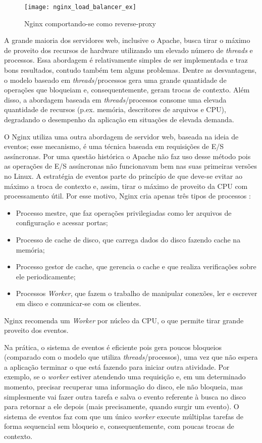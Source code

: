 \begin{figure}[!h]
  \centering
  \texttt{[image: nginx\_load\_balancer\_ex]} 
  \caption[Nginx comportando-se como reverse-proxy]{Nginx comportando-se como reverse-proxy \citep{soni}}
  \label{fig:nginx_basico} 
\end{figure}

A grande maioria dos servidores web, inclusive o Apache, busca tirar o máximo
de proveito dos recursos de hardware utilizando um elevado número de
\emph{threads} e processos. Essa abordagem é relativamente simples de ser
implementada e traz bons resultados, contudo também tem alguns problemas.
Dentre as desvantagens, o modelo baseado em \emph{threads}/processos gera uma
grande quantidade de operações que bloqueiam e, consequentemente, geram trocas
de contexto. Além disso, a abordagem baseada em \emph{threads}/processos
consome uma elevada quantidade de recursos (p.ex. memória, descritores de
arquivos e CPU), degradando o desempenho da aplicação em situações de elevada
demanda.

O Nginx utiliza uma outra abordagem de servidor web, baseada na ideia de eventos;
esse mecanismo, é uma técnica baseada em requisições de E/S assíncronas. Por
uma questão histórica o Apache não faz uso desse método pois as operações de
E/S assíncronas não funcionavam bem nas suas primeiras versões no Linux. A
estratégia de eventos parte do princípio de que deve-se evitar ao máximo a
troca de contexto e, assim, tirar o máximo de proveito da CPU com processamento
útil.  Por esse motivo, Nginx cria apenas três tipos de processos
\citep{nginx_architecture}:

\begin{itemize}
  \item Processo mestre, que faz operações privilegiadas como ler arquivos de configuração e acessar portas;
  \item Processo de cache de disco, que carrega dados do disco fazendo cache na memória;
  \item Processo gestor de cache, que gerencia o cache e que realiza verificações sobre ele periodicamente;
  \item Processos \emph{Worker}, que fazem o trabalho de manipular conexões, ler e escrever em disco e comunicar-se com os clientes.
\end{itemize}

Nginx recomenda um \emph{Worker} por núcleo da CPU, o que permite tirar
grande proveito dos eventos.

Na prática, o sistema de eventos é eficiente pois gera poucos bloqueios
(comparado com o modelo que utiliza \emph{threads}/processos), uma vez que não espera
a aplicação terminar o que está fazendo para iniciar outra atividade. Por
exemplo, se o \emph{worker} estiver atendendo uma requisição e, em um
determinado momento, precisar recuperar uma informação do disco, ele não
bloqueia, mas simplesmente vai fazer outra tarefa e salva o evento referente à
busca no disco para retornar a ele depois (mais precisamente, quando surgir um
evento). O sistema de eventos faz com que um único \emph{worker} execute
múltiplas tarefas de forma sequencial sem bloqueio e, consequentemente, com
poucas trocas de contexto.

